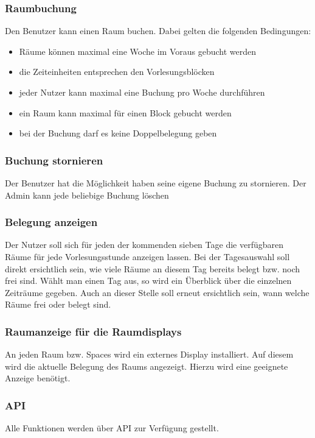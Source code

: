 \documentclass[a4paper,12pt]{article}
\begin{document}
\subsubsection{Raumbuchung}
Den Benutzer kann einen Raum buchen. Dabei gelten die folgenden Bedingungen:
\begin{itemize}
\item Räume können maximal eine Woche im Voraus gebucht werden
\item die Zeiteinheiten entsprechen den Vorlesungsblöcken
\item jeder Nutzer kann maximal eine Buchung pro Woche durchführen
\item ein Raum kann maximal für einen Block gebucht werden
\item bei der Buchung darf es keine Doppelbelegung geben
\end{itemize}

\subsubsection{Buchung stornieren}
Der Benutzer hat die Möglichkeit haben seine eigene Buchung zu stornieren.
Der Admin kann jede beliebige Buchung löschen

\subsubsection{Belegung anzeigen}
Der Nutzer soll sich für jeden der kommenden sieben Tage die verfügbaren Räume für jede Vorlesungsstunde anzeigen lassen. Bei der Tagesauswahl soll direkt ersichtlich sein, wie viele Räume an diesem Tag bereits belegt bzw. noch frei sind. Wählt man einen Tag aus, so wird ein Überblick über die einzelnen Zeiträume gegeben. Auch an dieser Stelle soll erneut ersichtlich sein, wann welche Räume frei oder belegt sind.

\subsubsection{Raumanzeige für die Raumdisplays}
An jeden Raum bzw. Spaces wird ein externes Display installiert. Auf diesem wird die aktuelle Belegung des Raums angezeigt. Hierzu wird eine geeignete Anzeige benötigt.

\subsubsection{API}
Alle Funktionen werden über API zur Verfügung gestellt.
\end{document}
